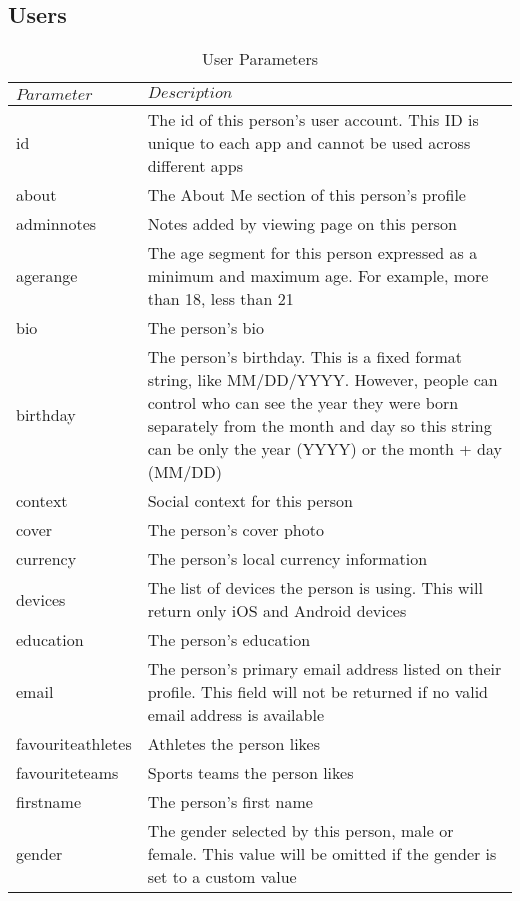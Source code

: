 \documentclass{article}
\begin{document}
	\subsection{Users}
		\begin{table}[H]
		\centering
		\caption{User Parameters}
		\label{my-label}
		\begin{tabularx}{\textwidth}{|l|X|}
		\hline
		$Parameter$ & $Description$ 	\\ \hline
		id 				& The id of this person's user account. This ID is unique to each app and cannot be used across different apps \\ \hline
		about 			& The About Me section of this person's profile \\ \hline
		admin\textunderscore notes 		& Notes added by viewing page on this person	\\ \hline
		age\textunderscore range 		& The age segment for this person expressed as a minimum and maximum age. For example, more than 18, less than 21 \\   \hline
		bio 		& The person's bio \\   \hline
		birthday 		& The person's birthday. This is a fixed format string, like MM/DD/YYYY. However, people can control who can see the year they were born separately from the month and day so this string can be only the year (YYYY) or the month + day (MM/DD) \\   \hline
		context 		& Social context for this person \\   \hline
		cover 		& The person's cover photo \\   \hline
		currency 		& The person's local currency information \\   \hline
		devices 			& The list of devices the person is using. This will return only iOS and Android devices \\ \hline
		education 			& The person's education \\ \hline
		email 			& The person's primary email address listed on their profile. This field will not be returned if no valid email address is available \\ \hline
		favourite\textunderscore athletes 		& Athletes the person likes	\\ \hline
		favourite\textunderscore teams 		& Sports teams the person likes	\\ \hline
		first\textunderscore name 		& The person's first name	\\ \hline
		gender 			& The gender selected by this person, male or female. This value will be omitted if the gender is set to a custom value

\end{tabularx}
\end{table}
\end{document}
